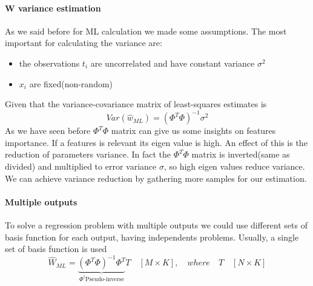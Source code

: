 \documentclass[../main.tex]{subfiles}
\begin{document}
\paragraph{W variance estimation} As we said before for ML calculation we made some assumptions. The most important for calculating the variance are:
\begin{itemize}
    \item the observations $t_i$ are uncorrelated and have constant variance $\sigma^2$
    \item $x_i$ are fixed(non-random)
\end{itemize}
Given that the variance-covariance matrix of least-squares estimates is
\begin{equation}
    Var(\hat{w}_{ML})=(\Phi^T\Phi)^{-1}\sigma^2
\end{equation}
As we have seen before $\Phi^T\Phi$ matrix can give us some insights on features importance. If a features is relevant its eigen value is high. An effect of this is the reduction of parameters variance. In fact the $\Phi^T\Phi$ matrix is inverted(same as divided) and multiplied to error variance $\sigma$, so high eigen values reduce variance.
We can achieve variance reduction by gathering more samples for our estimation.

\paragraph{Multiple outputs} To solve a regression problem with multiple outputs we could use different sets of basis function for each output, having independents problems. Usually, a single set of basis function is used
\begin{equation}
    \hat{W}_{ML}=\underbrace{(\Phi^T\Phi)^{-1}\Phi^T}_{\Phi^{\dagger} \text{Pseudo-inverse}} T\quad [M \times K],\quad where \quad T \quad [N \times K]
\end{equation}
\end{document}
